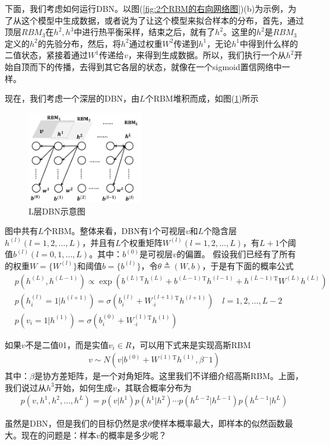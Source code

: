         \par
        下面，我们考虑如何运行DBN。以图(\ref{fig:2个RBM的右向网络图})(b)为示例，为了从这个模型中生成数据，或者说为了让这个模型来拟合样本的分布，首先，通过顶层$RBM _3$在$h^2,h^3$中进行热平衡采样，结束之后，就有了$h^2$。这里的$h^2$是$RBM_3$定义的$h^2$的先验分布，然后，将$h^2$通过权重$W^2$传递到$h^1$，无论$h^1$中得到什么样的二值状态，紧接着通过$W^1$传递给$v$，来得到生成数据。所以，我们执行一个从$h^2$开始自顶而下的传播，去得到其它各层的状态，就像在一个sigmoid置信网络中一样。
        \par
        现在，我们考虑一个深层的DBN，由$L$个RBM堆积而成，如图(\ref{fig:L层DBN示意图})所示
            \begin{figure}[H]
            \centering
            \includegraphics[height=4cm]{images/L_layer_DBN_illustration.jpg}
            \caption{L层DBN示意图}
            \label{fig:L层DBN示意图}
            \end{figure}
        图中共有$L$个RBM。整体来看，DBN有1个可视层$v$和$L$个隐含层$h^{(l)}(l=1,2,\dots,L)$，并且有$L$个权重矩阵$W^{(l)}(l=1,2,\dots,L)$，有$L+1$个阈值$b^{(l)}(l=0,1,\dots,L)$。其中：$b^{(0)}$是可视层$v$的偏置。 假设我们已经有了所有的权重$W = \{W^{(l)}\}$和阈值$b= \{b^{(l)}\}$，令$\theta\triangleq (W,b)$，于是有下面的概率公式
        \begin{align*}
        & p(h^{(L)},h^{(L-1)}) \propto \exp\left(b^{(L)}{}^\mathrm{T} h^{(L)} + b^{(L-1)}{}^\mathrm{T} h^{(l-1)} + h^{(L-1)}{}^\mathrm{T}W^{(L)}h^{(L)}\right)\\
        & p(h_i^{(l)}=1|h^{(l+1)}) = \sigma  \left( b_i^{(l)} + W_{\cdot i}^{(l+1)}{}^\mathrm{T}h^{(l+1)} \right)  \quad l=1,2,\dots,L-2\\
        & p(v_i = 1| h^{(1)}) = \sigma \left( b_i^{(0)}+W_{\cdot i}^{(1)}{}^\mathrm{T}h^{(1)} \right)
        \end{align*}
        \par
        如果$v$不是二值01，而是实值$v_i\in R$，可以用下式来是实现高斯RBM
        \begin{align*}
        v\sim N(v|b^{(0)}+ W^{(1)}{}^\mathrm{T}h^{(1)} ,\beta^-1)
        \end{align*}
        其中：$\beta$是协方差矩阵，是一个对角矩阵。这里我们不详细介绍高斯RBM。上面，我们说过从$h^3$开始，如何生成$v$，其联合概率分布为
        \begin{align*}
        p(v,h^1,h^2,\dots,h^L) = p(v|h^1)p(h^1|h^2)\cdots p(h^{L-2}|h^{L-1})p(h^{L-1}|h^{L})
        \end{align*}
        \par
        虽然是DBN，但是我们的目标仍然是求$\theta$使样本概率最大，即样本的似然函数最大。现在的问题是：样本$v$的概率是多少呢？

